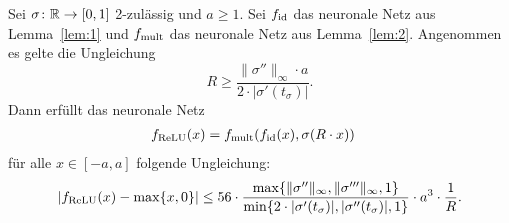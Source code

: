  \begin{lem}
  \label{lem:3}
  Sei $\sigma\colon \mathbb{R} \to [0, 1]$ 2-zulässig und $a \geq 1$. Sei $f_{\mathrm{id}}$ das neuronale Netz aus Lemma~\ref{lem:1} und $f_{\mathrm{mult}}$ das neuronale Netz aus Lemma~\ref{lem:2}. Angenommen es gelte die Ungleichung 
\begin{equation}
\label{lem:3:Vor1}   
 R \geq \frac{\|\sigma''\|_{\infty} \cdot a}{2 \cdot |\sigma'(t_{\sigma})|}.
\end{equation}
  Dann erfüllt das neuronale Netz 
  \begin{equation}
  \label{lem:3:Vor2}
  \begin{split}
  f_{\mathrm{ReLU}}(x) & = f_{\mathrm{mult}}(f_{\mathrm{id}}(x), \sigma(R \cdot x)) 
  \end{split}
  \end{equation}
 für alle $x \in [-a, a]$ folgende Ungleichung:
 $$|f_{\mathrm{ReLU}}(x) - \max\{x, 0\}| \leq 56 \cdot \frac{\max\{\|\sigma''\|_{\infty}, \|\sigma'''\|_{\infty}, 1\}}{\min\{2 \cdot |\sigma'(t_{\sigma})|, |\sigma''(t_{\sigma})|, 1\}} \cdot a^3 \cdot \frac{1}{R}.$$
  \end{lem}
